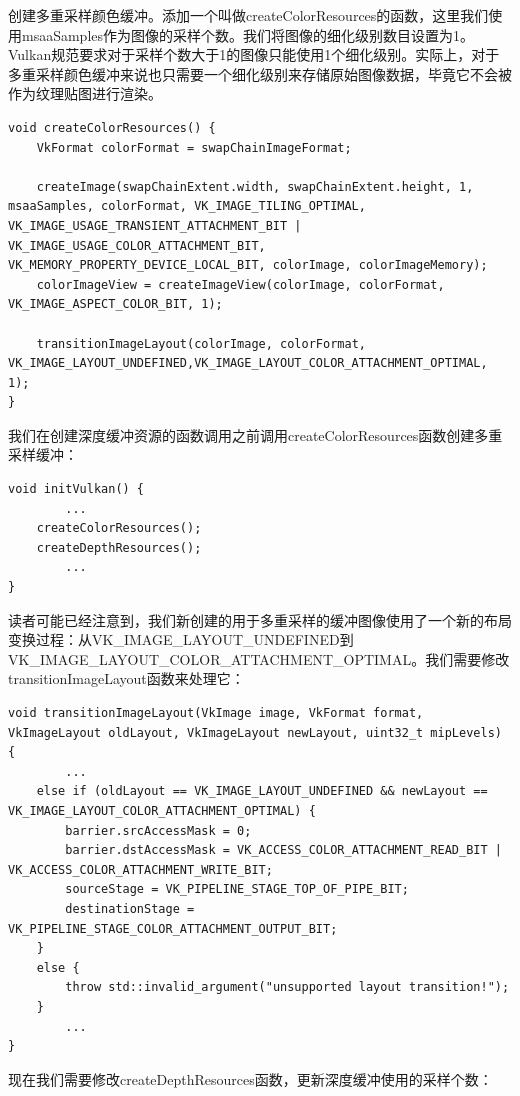 \documentclass{ctexart}
\begin{document}
创建多重采样颜色缓冲。添加一个叫做createColorResources的函数，这里我们使用msaaSamples作为图像的采样个数。我们将图像的细化级别数目设置为1。Vulkan规范要求对于采样个数大于1的图像只能使用1个细化级别。实际上，对于多重采样颜色缓冲来说也只需要一个细化级别来存储原始图像数据，毕竟它不会被作为纹理贴图进行渲染。

\begin{lstlisting}[language={[ANSI]C}]
void createColorResources() {
	VkFormat colorFormat = swapChainImageFormat;

	createImage(swapChainExtent.width, swapChainExtent.height, 1, msaaSamples, colorFormat, VK_IMAGE_TILING_OPTIMAL, VK_IMAGE_USAGE_TRANSIENT_ATTACHMENT_BIT | VK_IMAGE_USAGE_COLOR_ATTACHMENT_BIT, VK_MEMORY_PROPERTY_DEVICE_LOCAL_BIT, colorImage, colorImageMemory);
	colorImageView = createImageView(colorImage, colorFormat, VK_IMAGE_ASPECT_COLOR_BIT, 1);

	transitionImageLayout(colorImage, colorFormat, VK_IMAGE_LAYOUT_UNDEFINED,VK_IMAGE_LAYOUT_COLOR_ATTACHMENT_OPTIMAL, 1);
}
\end{lstlisting}

我们在创建深度缓冲资源的函数调用之前调用createColorResources函数创建多重采样缓冲：

\begin{lstlisting}[language={[ANSI]C}]
void initVulkan() {
		...
	createColorResources();
	createDepthResources();
		...
}
\end{lstlisting}

读者可能已经注意到，我们新创建的用于多重采样的缓冲图像使用了一个新的布局变换过程：从VK\_IMAGE\_LAYOUT\_UNDEFINED到VK\_IMAGE\_LAYOUT\_COLOR\_ATTACHMENT\_OPTIMAL。我们需要修改transitionImageLayout函数来处理它：

\begin{lstlisting}[language={[ANSI]C}]
void transitionImageLayout(VkImage image, VkFormat format, VkImageLayout oldLayout, VkImageLayout newLayout, uint32_t mipLevels) {
		...
	else if (oldLayout == VK_IMAGE_LAYOUT_UNDEFINED && newLayout == VK_IMAGE_LAYOUT_COLOR_ATTACHMENT_OPTIMAL) {
		barrier.srcAccessMask = 0;
		barrier.dstAccessMask = VK_ACCESS_COLOR_ATTACHMENT_READ_BIT | VK_ACCESS_COLOR_ATTACHMENT_WRITE_BIT;
		sourceStage = VK_PIPELINE_STAGE_TOP_OF_PIPE_BIT;
		destinationStage = VK_PIPELINE_STAGE_COLOR_ATTACHMENT_OUTPUT_BIT;
	}
	else {
		throw std::invalid_argument("unsupported layout transition!");
	}
		...
}
\end{lstlisting}

现在我们需要修改createDepthResources函数，更新深度缓冲使用的采样个数：
\end{document}

